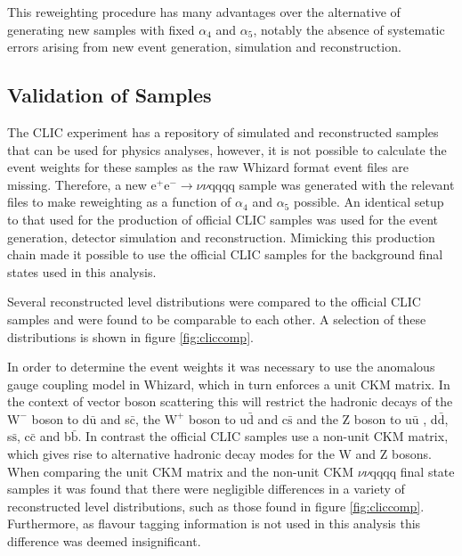 This reweighting procedure has many advantages over the alternative of generating new samples with fixed $\alpha_{4}$ and $\alpha_{5}$, notably the absence of systematic errors arising from new event generation, simulation and reconstruction.  

\subsection{Validation of Samples}
\label{sec:validationofsamples}
The CLIC experiment has a repository of simulated and reconstructed samples that can be used for physics analyses, however, it is not possible to calculate the event weights for these samples as the raw Whizard format event files are missing.  Therefore, a new $\text{e}^{+}\text{e}^{-} \rightarrow \nu\nu\text{qqqq}$ sample was generated with the relevant files to make reweighting as a function of $\alpha_{4}$ and $\alpha_{5}$ possible.  An identical setup to that used for the production of official CLIC samples was used for the event generation, detector simulation and reconstruction.  Mimicking this production chain made it possible to use the official CLIC samples for the background final states used in this analysis.  

Several reconstructed level distributions were compared to the official CLIC samples and were found to be comparable to each other. A selection of these distributions is shown in figure \ref{fig:cliccomp}.

In order to determine the event weights it was necessary to use the anomalous gauge coupling model in Whizard, which in turn enforces a unit CKM matrix.  In the context of vector boson scattering this will restrict the hadronic decays of the $\text{W}^{-}$ boson to d$\bar{\text{u}}$ and s$\bar{\text{c}}$, the $\text{W}^{+}$ boson to u$\bar{\text{d}}$ and c$\bar{\text{s}}$ and the Z boson to u$\bar{\text{u}}$ , d$\bar{\text{d}}$, s$\bar{\text{s}}$, c$\bar{\text{c}}$ and b$\bar{\text{b}}$.  In contrast the official CLIC samples use a non-unit CKM matrix, which gives rise to alternative hadronic decay modes for the W and Z bosons.  When comparing the unit CKM matrix and the non-unit CKM $\nu\nu\text{qqqq}$ final state samples it was found that there were negligible differences in a variety of reconstructed level distributions, such as those found in figure \ref{fig:cliccomp}.  Furthermore, as flavour tagging information is not used in this analysis this difference was deemed insignificant.  

